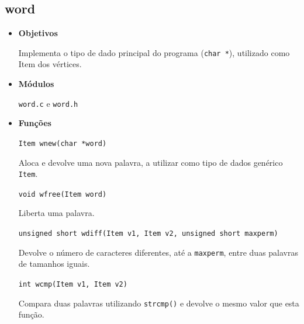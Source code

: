 \documentclass[portuguese, a4paper]{article}
\newcommand\tu[0]{\textunderscore}
\begin{document}
	\subsection{word}
	\begin{itemize}
		\item \textbf{Objetivos}
		\par
		Implementa o tipo de dado principal do programa (\texttt{char *}),
		utilizado como Item dos vértices.

		\item \textbf{Módulos}
		\par
		\texttt{word.c} e \texttt{word.h}

		\item \textbf{Funções}
		\par
		\texttt{Item w\tu new(char *word)}
		\par
		Aloca e devolve uma nova palavra, a utilizar como tipo de dados
		genérico \texttt{Item}.

		\par\null\par
		\texttt{void w\tu free(Item word)}
		\par
		Liberta uma palavra.

		\par\null\par
		\texttt{unsigned short w\tu diff(Item v1, Item v2, unsigned short
		max\tu perm)}
		\par
		Devolve o número de caracteres diferentes, até a \texttt{max\tu perm},
		entre duas palavras de tamanhos iguais.

		\par\null\par
		\texttt{int w\tu cmp(Item v1, Item v2)}
		\par
		Compara duas palavras utilizando \texttt{strcmp()} e devolve o mesmo
		valor que esta função.
	\end{itemize}
\end{document}
